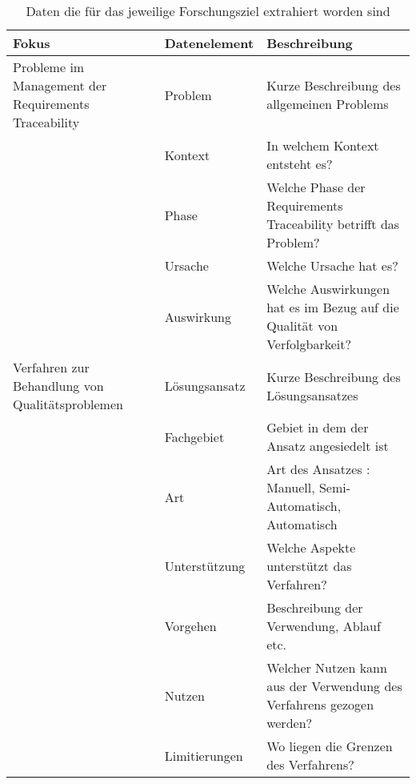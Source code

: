 \begin{table*}[t]
    \centering
    \begin{tabularx}{\textwidth}{lXX}
        \toprule
        Fokus & Datenelement & Beschreibung \\ \midrule
        Probleme im Management der Requirements Traceability            & Problem       & Kurze Beschreibung des allgemeinen Problems \\
                                                                        & Kontext       & In welchem Kontext entsteht es? \\
                                                                        & Phase         & Welche Phase der Requirements Traceability betrifft das Problem? \\
                                                                        & Ursache       & Welche Ursache hat es?  \\
                                                                        & Auswirkung    & Welche Auswirkungen hat es im Bezug auf die Qualität von Verfolgbarkeit? \\
        Verfahren zur Behandlung von Qualitätsproblemen                 & Lösungsansatz & Kurze Beschreibung des Lösungsansatzes \\
                                                                        & Fachgebiet    & Gebiet in dem der Ansatz angesiedelt ist  \\
                                                                        & Art           & Art des Ansatzes : Manuell, Semi-Automatisch, Automatisch \\
                                                                        & Unterstützung & Welche Aspekte unterstützt das Verfahren? \\
                                                                        & Vorgehen      & Beschreibung der Verwendung, Ablauf etc. \\
                                                                        & Nutzen        & Welcher Nutzen kann aus der Verwendung des Verfahrens gezogen werden? \\
                                                                        & Limitierungen & Wo liegen die Grenzen des Verfahrens? \\
    \bottomrule
    \end{tabularx}
    \caption{Daten die für das jeweilige Forschungsziel extrahiert worden sind}
    \label{tab:dataextraction_special}
\end{table*}


